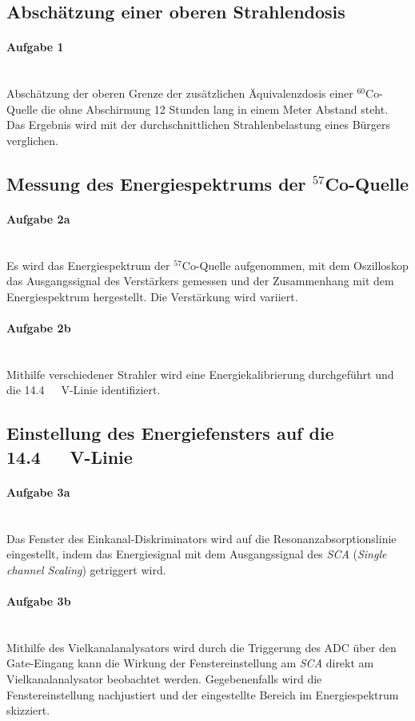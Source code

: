 \documentclass[a4paper,twoside,final]{article}
\begin{document}
\subsection{Abschätzung einer oberen Strahlendosis}
\paragraph{Aufgabe 1}$~$\\
Abschätzung der oberen Grenze der zusätzlichen Äquivalenzdosis einer $^{60}$Co-Quelle die ohne Abschirmung 12 Stunden lang in einem Meter Abstand steht. Das Ergebnis wird mit der durchschnittlichen Strahlenbelastung eines Bürgers verglichen.
\subsection{Messung des Energiespektrums der $^{57}$Co-Quelle}

\paragraph{Aufgabe 2a}$~$\\
Es wird das Energiespektrum der $^{57}$Co-Quelle aufgenommen, mit dem Oszilloskop das Ausgangssignal des Verstärkers gemessen und der Zusammenhang mit dem Energiespektrum hergestellt. Die Verstärkung wird variiert.
\paragraph{Aufgabe 2b}$~$\\
Mithilfe verschiedener Strahler wird eine Energiekalibrierung durchgeführt und die \SI{14,4}{\kilo{}\volt}-Linie identifiziert.

\subsection{Einstellung des Energiefensters auf die \SI{14,4}{\kilo{}\volt}-Linie}
\paragraph{Aufgabe 3a}$~$\\
Das Fenster des Einkanal-Diskriminators wird auf die Resonanzabsorptionslinie eingestellt, indem das Energiesignal mit dem Ausgangssignal des \textit{SCA} (\textit{Single channel Scaling}) getriggert wird.
\paragraph{Aufgabe 3b}$~$\\
Mithilfe des Vielkanalanalysators wird durch die Triggerung des ADC über den Gate-Eingang kann die Wirkung der Fenstereinstellung am \textit{SCA} direkt am Vielkanalanalysator beobachtet werden. Gegebenenfalls wird die Fenstereinstellung nachjustiert und der eingestellte Bereich im Energiespektrum skizziert.
\end{document}
